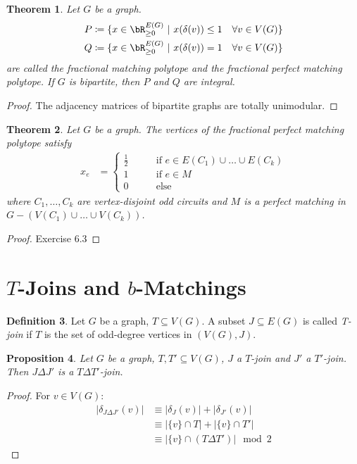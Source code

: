 \documentclass[11pt, a4paper]{article}
\newcommand{\abs}[1]{\left\lvert#1\right\rvert}
\newcommand{\set}[1]{\{#1\}}
\newtheorem{theorem}{Theorem}[section]
\newtheorem{prop}[theorem]{Proposition}
\theoremstyle{remark}
\theoremstyle{definition}
\newtheorem{definition}[theorem]{Definition}
\begin{document}

\begin{theorem}
	Let $G$ be a graph.
	\begin{align*}
		P & \coloneqq \set{x\in\bR_{\geq0}^{E(G)}\ |\ x(\delta(v))\leq 1 \quad\forall v\in V(G)} \\
		Q & \coloneqq\set{x\in\bR_{\geq0}^{E(G)}\ |\ x(\delta(v))=1 \quad\forall v\in V(G)}
	\end{align*}
	are called the \emph{fractional matching polytope} and the \emph{fractional
		perfect matching polytope}.
	If $G$ is bipartite, then $P$ and $Q$ are integral.
\end{theorem}
\begin{proof}
	The adjacency matrices of bipartite graphs are totally unimodular.
\end{proof}

\begin{theorem}
	Let $G$ be a graph. The vertices of the fractional perfect matching
	polytope satisfy
	\begin{align*}
		x_e & =\begin{cases}
			       \frac{1}{2} \qquad & \text{if }e\in E(C_1)\cup\ldots\cup E(C_k) \\
			       1 \qquad           & \text{if }e\in M                           \\
			       0 \qquad           & \text{else}
		       \end{cases}
	\end{align*}
	where $C_1,\ldots,C_k$ are vertex-disjoint odd circuits and $M$ is a perfect
	matching in $G-\left(V(C_1)\cup\ldots\cup V(C_k)\right)$.
\end{theorem}
\begin{proof}
	Exercise 6.3
\end{proof}

\section{\texorpdfstring{$T$}{T}-Joins and \texorpdfstring{$b$}{b}-Matchings}
\begin{definition}
	Let $G$ be a graph, $T\subseteq V(G)$. A subset $J\subseteq E(G)$ is called
	\emph{T-join} if $T$ is the set of odd-degree vertices in $(V(G),J)$.
\end{definition}

\begin{prop}\label{prop:t-join-symm-diff}
	Let $G$ be a graph, $T,T'\subseteq V(G)$, $J$ a $T$-join and $J'$ a $T'$-join.
	Then $J\Delta J'$ is a $T\Delta T'$-join.
\end{prop}
\begin{proof}
	For $v\in V(G)$:
	\begin{align*}
		\abs{\delta_{J\Delta J'}(v)} & \equiv \abs{\delta_J(v)}+\abs{\delta_{J'}(v)}   \\
		                             & \equiv \abs{\set{v}\cap T}+\abs{\set{v}\cap T'} \\
		                             & \equiv \abs{\set{v}\cap (T\Delta T')} \mod 2
	\end{align*}
\end{proof}
\end{document}
